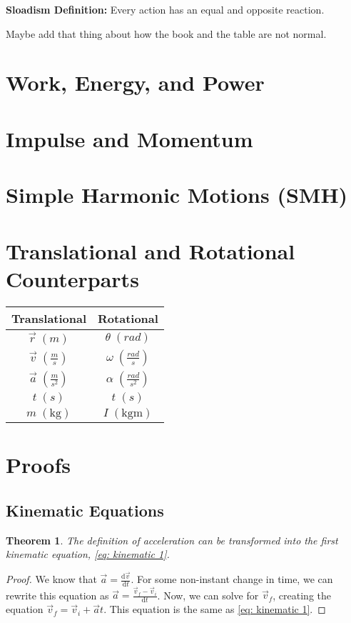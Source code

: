 \documentclass{article}
\newtheorem{theorem}{Theorem}[section]
\newcommand{\unitP}[1]{\; (\mathrm{#1})}
\begin{document}
\noindent \textbf{Sloadism Definition:} Every action has an equal and opposite reaction.

Maybe add that thing about how the book and the table are not normal.

\newpage
\section{Work, Energy, and Power}

\newpage
\section{Impulse and Momentum}

\newpage
\section{Simple Harmonic Motions (SMH)}

\newpage
\appendix

\section{Translational and Rotational Counterparts}\label{Appendix A}

\begin{center}
\begin{tabular}{|c | c |}
    \hline
    Translational & Rotational \\
    \hline \hline
    $\vec{r} \; (m)$ & $\theta \; (rad)$ \\
    $\vec{v} \; (\frac{m}{s}) $ & $\omega \; (\frac{rad}{s})$ \\
    $\vec{a} \; (\frac{m}{s^2})$ & $\alpha \; (\frac{rad}{s^2})$ \\
    $t \; (s)$ & $t \; (s)$ \\
    \hline \hline
    $m \; (\mathrm{kg})$ & $I \unitP{kgm}$\\
    \hline
\end{tabular}
\end{center}

\newpage
\section{Proofs}\label{Appendix B}

\subsection{Kinematic Equations}
\begin{theorem}
    The definition of acceleration can be transformed into the first kinematic equation, \ref{eq: kinematic 1}.
\end{theorem}
\begin{proof}
    We know that $\vec{a} = \frac{\mathrm{d}\vec{v}}{\mathrm{d}t}$. For some non-instant change in time, we can rewrite this equation as 
    $\vec{a} = \frac{\vec{v}_f - \vec{v}_i}{\mathrm{d}t}$. Now, we can solve for $\vec{v}_f$, creating the equation $\vec{v}_f = \vec{v}_i + \vec{a}t$.
    This equation is the same as \ref{eq: kinematic 1}.
\end{proof}
\end{document}
